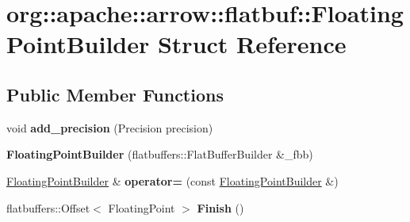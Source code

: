\hypertarget{structorg_1_1apache_1_1arrow_1_1flatbuf_1_1FloatingPointBuilder}{}\section{org\+:\+:apache\+:\+:arrow\+:\+:flatbuf\+:\+:Floating\+Point\+Builder Struct Reference}
\label{structorg_1_1apache_1_1arrow_1_1flatbuf_1_1FloatingPointBuilder}
\subsection*{Public Member Functions}
\begin{DoxyCompactItemize}
\item 
void {\bfseries add\+\_\+precision} (Precision precision)\hypertarget{structorg_1_1apache_1_1arrow_1_1flatbuf_1_1FloatingPointBuilder_abce724f5d77a735236fcca4dc6bd6589}{}\label{structorg_1_1apache_1_1arrow_1_1flatbuf_1_1FloatingPointBuilder_abce724f5d77a735236fcca4dc6bd6589}

\item 
{\bfseries Floating\+Point\+Builder} (flatbuffers\+::\+Flat\+Buffer\+Builder \&\+\_\+fbb)\hypertarget{structorg_1_1apache_1_1arrow_1_1flatbuf_1_1FloatingPointBuilder_ab6acecc18cd6639dccfd0e05c0136812}{}\label{structorg_1_1apache_1_1arrow_1_1flatbuf_1_1FloatingPointBuilder_ab6acecc18cd6639dccfd0e05c0136812}

\item 
\hyperlink{structorg_1_1apache_1_1arrow_1_1flatbuf_1_1FloatingPointBuilder}{Floating\+Point\+Builder} \& {\bfseries operator=} (const \hyperlink{structorg_1_1apache_1_1arrow_1_1flatbuf_1_1FloatingPointBuilder}{Floating\+Point\+Builder} \&)\hypertarget{structorg_1_1apache_1_1arrow_1_1flatbuf_1_1FloatingPointBuilder_a8898f1a553bb382f42c6817f684530a3}{}\label{structorg_1_1apache_1_1arrow_1_1flatbuf_1_1FloatingPointBuilder_a8898f1a553bb382f42c6817f684530a3}

\item 
flatbuffers\+::\+Offset$<$ Floating\+Point $>$ {\bfseries Finish} ()\hypertarget{structorg_1_1apache_1_1arrow_1_1flatbuf_1_1FloatingPointBuilder_a629034ce5d07efbd5f7105edf8831668}{}\label{structorg_1_1apache_1_1arrow_1_1flatbuf_1_1FloatingPointBuilder_a629034ce5d07efbd5f7105edf8831668}

\end{DoxyCompactItemize}
